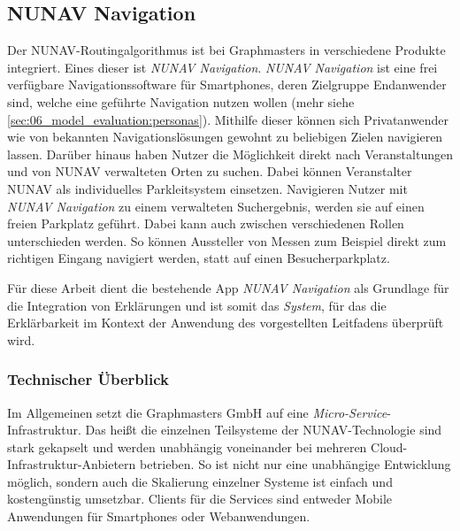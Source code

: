 \subsection{NUNAV Navigation}

Der NUNAV-Routingalgorithmus ist bei Graphmasters in verschiedene Produkte integriert. Eines dieser ist \textit{NUNAV Navigation}. \textit{NUNAV Navigation} ist eine frei verfügbare Navigationssoftware für Smartphones, deren Zielgruppe Endanwender sind, welche eine geführte Navigation nutzen wollen (mehr siehe \autoref{sec:06_model_evaluation:personas}). Mithilfe dieser können sich Privatanwender wie von bekannten Navigationslösungen gewohnt zu beliebigen Zielen navigieren lassen. Darüber hinaus haben Nutzer die Möglichkeit direkt nach Veranstaltungen und von NUNAV verwalteten Orten zu suchen. Dabei können Veranstalter NUNAV als individuelles Parkleitsystem einsetzen. Navigieren Nutzer mit \textit{NUNAV Navigation} zu einem verwalteten Suchergebnis, werden sie auf einen freien Parkplatz geführt. Dabei kann auch zwischen verschiedenen Rollen unterschieden werden. So können Aussteller von Messen zum Beispiel direkt zum richtigen Eingang navigiert werden, statt auf einen Besucherparkplatz.

Für diese Arbeit dient die bestehende App \textit{NUNAV Navigation} als Grundlage für die Integration von Erklärungen und ist somit das \textit{System}, für das die Erklärbarkeit im Kontext der Anwendung des vorgestellten Leitfadens überprüft wird.

\subsubsection{Technischer Überblick}

Im Allgemeinen setzt die Graphmasters GmbH auf eine \textit{Micro-Service}-Infrastruktur. Das heißt die einzelnen Teilsysteme der NUNAV-Technologie sind stark gekapselt und werden unabhängig voneinander bei mehreren Cloud-Infrastruktur-Anbietern betrieben. So ist nicht nur eine unabhängige Entwicklung möglich, sondern auch die Skalierung einzelner Systeme ist einfach und kostengünstig umsetzbar. Clients für die Services sind entweder Mobile Anwendungen für Smartphones oder Webanwendungen.


